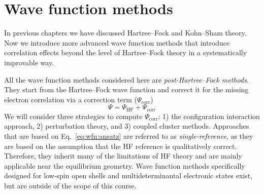 \documentclass[../Main/notes.tex]{subfiles}
\begin{document}
\chapter{Wave function methods}

In previous chapters we have discussed Hartree--Fock and Kohn--Sham theory.
Now we introduce more advanced wave function methods that introduce correlation effects beyond the level of Hartree--Fock theory in a systematically improvable way.


All the wave function methods considered here are \emph{post-Hartree--Fock methods}.
They start from the Hartree--Fock wave function and correct it for the missing electron correlation via a correction term ($\Psi_\mathrm{corr}$)
\begin{equation}
\label{eq:wfn:ansatz}
\Psi = \Psi_\mathrm{HF} +  \Psi_\mathrm{corr}
\end{equation}
We will consider three strategies to compute $\Psi_\mathrm{corr}$: 1) the configuration interaction approach, 2) perturbation theory, and 3) coupled cluster methods.
Approaches that are based on Eq.~\eqref{eq:wfn:ansatz} are referred to as \emph{single-reference}, as they are based on the assumption that the HF reference is qualitatively correct.
Therefore, they inherit many of the limitations of HF theory and are mainly applicable near the equilibrium geometry.
Wave function methods specifically designed for low-spin open shells and multideterminantal electronic states exist, but are outside of the scope of this course.
\end{document}
